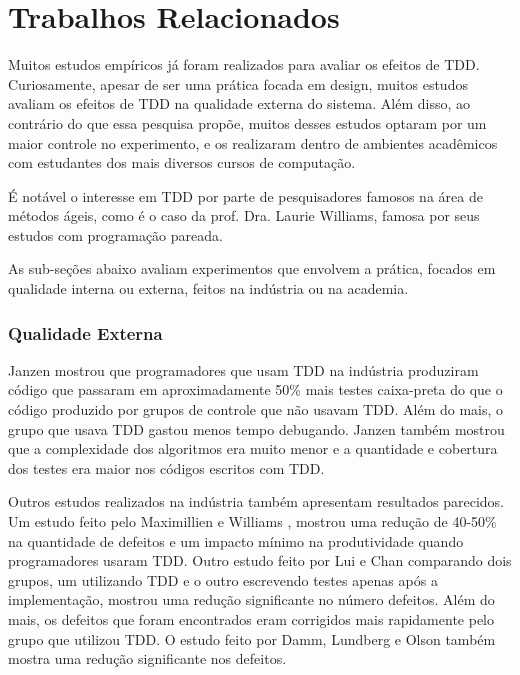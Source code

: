 \chapter{Trabalhos Relacionados}
\label{cap:trabalhos-relacionados}

Muitos estudos empíricos já foram realizados para avaliar os efeitos de TDD.
Curiosamente, apesar de ser uma prática focada em design, muitos estudos avaliam
os efeitos de TDD na qualidade externa do sistema. Além disso, ao
contrário do que essa pesquisa propõe, muitos desses estudos optaram por um
maior controle no experimento, e os realizaram dentro de ambientes acadêmicos 
com estudantes dos mais diversos cursos de computação.

É notável o interesse em TDD por parte de pesquisadores famosos na área de
métodos ágeis, como é o caso da prof. Dra. Laurie Williams, famosa por seus
estudos com programação pareada.

As sub-seções abaixo avaliam experimentos que envolvem a prática, focados em
qualidade interna ou externa, feitos na indústria ou na academia.

\subsection{Qualidade Externa}

Janzen \cite{janzen-arch-improvement} mostrou que programadores que usam TDD na indústria
produziram código que passaram em aproximadamente 50\% mais testes caixa-preta
do que o código produzido por grupos de controle que não usavam TDD. Além do
mais, o grupo que usava TDD gastou menos tempo debugando. Janzen também mostrou 
que a complexidade dos algoritmos era muito menor e a quantidade e cobertura dos
testes era maior nos códigos escritos com TDD.

Outros estudos realizados na indústria também apresentam resultados parecidos.
Um estudo feito pelo Maximillien e Williams \cite{max-e-williams}, mostrou uma
redução de 40-50\% na quantidade de defeitos e um impacto mínimo na
produtividade  quando programadores usaram TDD. Outro estudo feito por Lui e
Chan  \cite{lui-e-chan} comparando dois grupos, um utilizando TDD e o outro 
escrevendo testes apenas após a implementação, mostrou uma redução significante 
no número defeitos. Além do mais, os defeitos que foram encontrados eram 
corrigidos mais rapidamente pelo grupo que utilizou TDD. O estudo feito por 
Damm, Lundberg e Olson \cite{damn-lundberg-e-olson} também mostra uma redução
significante nos defeitos.

